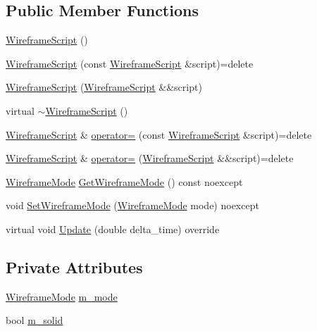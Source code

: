\subsection*{Public Member Functions}
\begin{DoxyCompactItemize}
\item 
\hyperlink{classmage_1_1_wireframe_script_a3dc73b04bdab31e19b46360bfe5f4766}{Wireframe\+Script} ()
\item 
\hyperlink{classmage_1_1_wireframe_script_abd35f16fba0de4d370728e832d757473}{Wireframe\+Script} (const \hyperlink{classmage_1_1_wireframe_script}{Wireframe\+Script} \&script)=delete
\item 
\hyperlink{classmage_1_1_wireframe_script_a465b1b144af8376b2f9afdd11c51af98}{Wireframe\+Script} (\hyperlink{classmage_1_1_wireframe_script}{Wireframe\+Script} \&\&script)
\item 
virtual \hyperlink{classmage_1_1_wireframe_script_abbb814f01dce03195e83b24bf244757f}{$\sim$\+Wireframe\+Script} ()
\item 
\hyperlink{classmage_1_1_wireframe_script}{Wireframe\+Script} \& \hyperlink{classmage_1_1_wireframe_script_a0382415dade9f889b1edebf2ee5aa770}{operator=} (const \hyperlink{classmage_1_1_wireframe_script}{Wireframe\+Script} \&script)=delete
\item 
\hyperlink{classmage_1_1_wireframe_script}{Wireframe\+Script} \& \hyperlink{classmage_1_1_wireframe_script_a6be79bd5b62f7cf6e9d1237dba0a5bdc}{operator=} (\hyperlink{classmage_1_1_wireframe_script}{Wireframe\+Script} \&\&script)=delete
\item 
\hyperlink{classmage_1_1_wireframe_script_a99d65e77e89c2581544e68030adcefb7}{Wireframe\+Mode} \hyperlink{classmage_1_1_wireframe_script_accb26312ff13e368cc0a3ce565d893f4}{Get\+Wireframe\+Mode} () const noexcept
\item 
void \hyperlink{classmage_1_1_wireframe_script_a6af1f089855ac68fd0a7e8d3e46560f1}{Set\+Wireframe\+Mode} (\hyperlink{classmage_1_1_wireframe_script_a99d65e77e89c2581544e68030adcefb7}{Wireframe\+Mode} mode) noexcept
\item 
virtual void \hyperlink{classmage_1_1_wireframe_script_af077736607ad22f66d8553066af51760}{Update} (double delta\+\_\+time) override
\end{DoxyCompactItemize}
\subsection*{Private Attributes}
\begin{DoxyCompactItemize}
\item 
\hyperlink{classmage_1_1_wireframe_script_a99d65e77e89c2581544e68030adcefb7}{Wireframe\+Mode} \hyperlink{classmage_1_1_wireframe_script_a93de9a9a8bac873b63e7529df3327ef1}{m\+\_\+mode}
\item 
bool \hyperlink{classmage_1_1_wireframe_script_a5e038a5e1615ab9323132a3e0a228a82}{m\+\_\+solid}
\end{DoxyCompactItemize}

